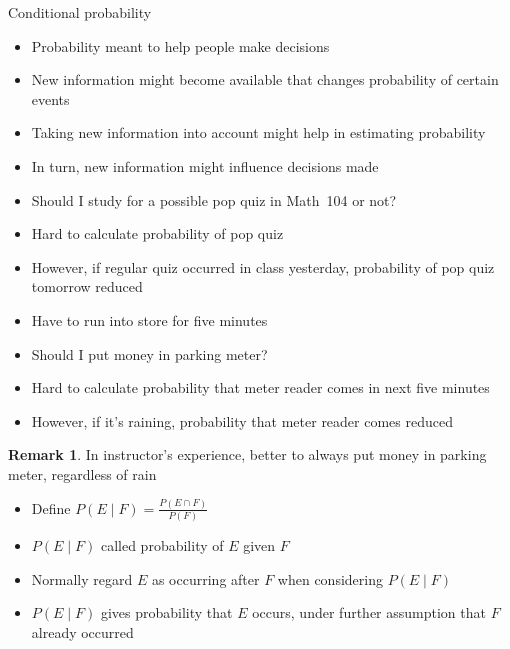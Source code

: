 \documentclass[handout]{beamer}
\theoremstyle{definition}
\newtheorem{remark}{Remark}
\begin{document}
\begin{frame}{Conditional probability}
\begin{itemize}
\item Probability meant to help people make decisions
\item New information might become available
that changes probability of certain events
\item Taking new information into account
might help in estimating probability
\item In turn, new information might influence decisions made
\end{itemize}
\begin{example}
\begin{itemize}
\item Should I study for a possible pop quiz in Math~104 or not?
\item Hard to calculate probability of pop quiz
\item However, if regular quiz occurred in class yesterday,
probability of pop quiz tomorrow reduced
\end{itemize}
\end{example}
\end{frame}

\begin{frame}
\begin{example}
\begin{itemize}
\item Have to run into store for five minutes
\item Should I put money in parking meter?
\item Hard to calculate probability that meter reader
comes in next five minutes
\item However, if it's raining, probability that meter reader
comes reduced
\end{itemize}
\end{example}
\begin{remark}
In instructor's experience, better to always put money
in parking meter, regardless of rain
\end{remark}
\end{frame}

\begin{frame}
\begin{definition}
\begin{itemize}
\item Define $P\left(E\mid F\right)
=\frac{P\left(E\cap F\right)}{P\left(F\right)}$
\item $P\left(E\mid F\right)$ called
\alert{probability of $E$ given $F$}
\end{itemize}
\end{definition}
\begin{itemize}
\item Normally regard $E$ as occurring
\alert{after} $F$ when considering $P\left(E\mid F\right)$
\item $P\left(E\mid F\right)$ gives probability that $E$ occurs,
under further assumption that $F$ already occurred
\end{itemize}
\end{frame}
\end{document}

